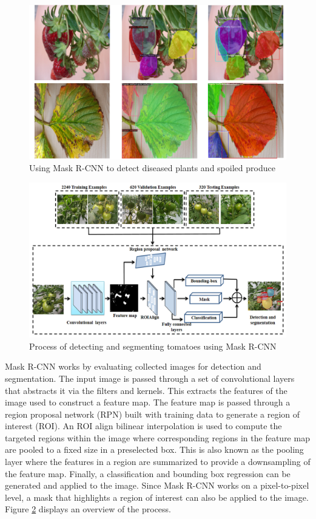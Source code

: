 \documentclass[12pt]{article}
\begin{document}
\begin{figure}[h]
\centering
\includegraphics[width=1.0\textwidth]{dp6.png}
\caption{Using Mask R-CNN to detect diseased plants and spoiled produce~\cite{afzaal2021instance}}
\label{fig:disease}
\end{figure}

\begin{figure}[h]
\centering
\includegraphics[width=1.0\textwidth]{process.png}
\caption{Process of detecting and segmenting tomatoes using Mask R-CNN~\cite{zu2021detection}}
\label{fig:process}
\end{figure}

Mask R-CNN works by evaluating collected images for detection and segmentation. The input image is passed through a set of convolutional layers that abstracts it via the filters and kernels. This extracts the features of the image used to construct a feature map. The feature map is passed through a region proposal network (RPN) built with training data to generate a region of interest (ROI). An ROI align bilinear interpolation is used to compute the targeted regions within the image where corresponding regions in the feature map are pooled to a fixed size in a preselected box. This is also known as the pooling layer where the features in a region are summarized to provide a downsampling of the feature map. Finally, a classification and bounding box regression can be generated and applied to the image. Since Mask R-CNN works on a pixel-to-pixel level, a mask that highlights a region of interest can also be applied to the image. Figure \ref{fig:process} displays an overview of the process.
\end{document}

